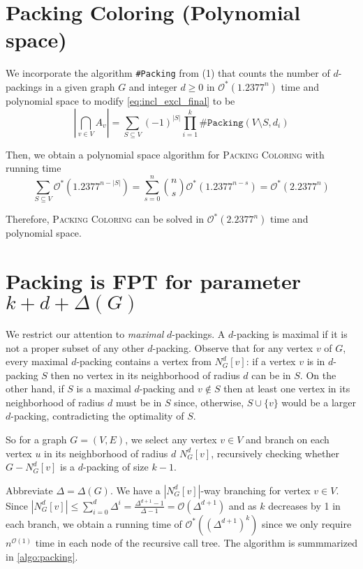 \documentclass[10pt, a4paper]{article}
\theoremstyle{definition}
\newcommand{\mcO}{\mathcal{O}}
\begin{document}
\section{\sc Packing Coloring (\textnormal{Polynomial space})}

We incorporate the algorithm \texttt{\#Packing} from (1) that counts the number of $d$-packings in a given graph $G$ and integer $d \ge 0$ in $\mcO^*(1.2377^n)$ time and polynomial space to modify \cref{eq:incl_excl_final} to be
\begin{equation*}
	\left | \bigcap_{v \in V} A_v \right | 
	= \sum_{S \subseteq V} (-1)^{|S|} \prod_{i=1}^{k} \texttt{\#Packing}(V \setminus S, d_i)
\end{equation*}

Then, we obtain a polynomial space algorithm for \textsc{Packing Coloring} with running time
\begin{equation*}
	\sum_{S\subseteq V} \mcO^*(1.2377^{n-|S|}) = \sum_{s=0}^n \binom{n}{s} \mcO^*(1.2377^{n-s}) = \mcO^*(2.2377^n)
\end{equation*}

Therefore, \textsc{Packing Coloring} can be solved in $\mcO^*(2.2377^n)$ time and polynomial space.

\section{\sc Packing \textnormal{is FPT for parameter $k + d + \Delta (G)$} }

We restrict our attention to \emph{maximal} $d$-packings. A $d$-packing is maximal if it is not a proper subset of any other $d$-packing. Observe that for any vertex $v$ of $G$, every maximal $d$-packing contains a vertex from $N_G^d[v]$: if a vertex $v$ is in $d$-packing $S$ then no vertex in its neighborhood of radius $d$ can be in $S$. On the other hand, if $S$ is a maximal $d$-packing and $v \notin S$ then at least one vertex in its neighborhood of radius $d$ must be in $S$ since, otherwise, $S\cup \{ v \}$ would be a larger $d$-packing, contradicting the optimality of $S$.

So for a graph $G = (V, E)$, we select any vertex $v \in V$ and branch on each vertex $u$ in its neighborhood of radius $d$ $N_G^d[v]$, recursively checking whether $G-N_G^d[v]$ is a $d$-packing of size $k-1$. 

Abbreviate $\Delta = \Delta(G)$. We have a $|N_G^d[v]|$-way branching for vertex $v \in V$. Since $|N_G^d[v]| \leq \sum_{i=0}^{d} \Delta^i = \frac{\Delta^{d+1}-1}{\Delta-1} = \mcO(\Delta^{d+1})$ and as $k$ decreases by 1 in each branch, we obtain a running time of $\mcO^{*}((\Delta^{d+1})^k)$ since we only require $n^{\mcO(1)}$ time in each node of the recursive call tree. The algorithm is summmarized in \cref{algo:packing}.
\end{document}
